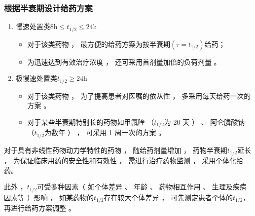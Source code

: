 \documentclass[dvipsnames, svgnames, x11names]{beamer}
\begin{document}
\begin{frame}
    \frametitle{根据半衰期设计给药方案}
    \begin{enumerate}
      \item[3.] 慢速处置类$8 \mathrm{h} \leqslant t_{1/2}\leqslant 24 \mathrm{h}$
            \begin{itemize}
              \item 对于该类药物 ， 最方便的给药方案为按半衰期$(\tau = t_{1/2})$给药；
              \item 为迅速达到有效治疗浓度 ， 还可采用首剂量加倍的负荷剂量 。
            \end{itemize}
      \item[4.] 极慢速处置类$t_{1/2}\geqslant 24 \mathrm{h}$
            \begin{itemize}
              \item 对于该类药物 ， 为了提高患者对医嘱的依从性 ， 多采用每天给药一次的方案 。
              \item 对于某些半衰期特别长的药物如甲氟喹 （$t_{1/2}$为 20 天 ） 、 阿仑膦酸钠 （$t_{1/2}$为数年 ） ， 可采用 1 周一次的方案 。
            \end{itemize}
    \end{enumerate}

    \vspace{-3pt}
    \begin{blankblock}{}
        对于具有非线性药物动力学特性的药物 ， 随给药剂量增加 ， 药物半衰期$t_{1/2}$延长 ， 为保证临床用药的安全性和有效性 ， 需进行治疗药物监测 ， 采用个体化给药。
        
        此外 ，$t_{1/2}$可受多种因素（ 如个体差异 、 年龄 、 药物相互作用 、 生理及疾病因素等 ）影响 ， 如某药物的$t_{1/2}$存在较大个体差异 ， 可先测定患者个体的$t_{1/2}$， 再进行给药方案调整 。
    \end{blankblock}
\end{frame}
\end{document}
